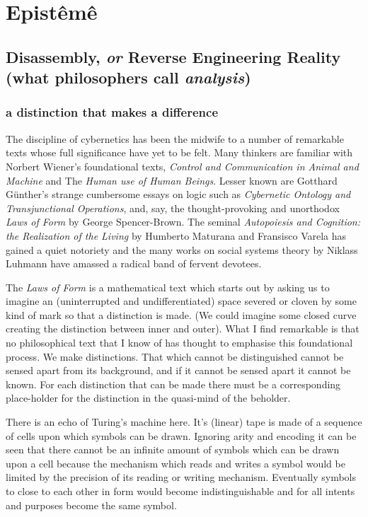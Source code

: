 \documentclass[dah,phd,a4paper]{xe_uccthesis}
\newcommand{\work}[1] {\textit{#1}}
\begin{document}
\renewcommand\thepart{\Alph{part}}
\part{Epistêmê}

\newpage{}


\chapter{Disassembly, \emph{or} Reverse Engineering Reality (what philosophers call \emph{analysis})}

\section{a distinction that makes a difference}

	The discipline of cybernetics has been the midwife to a number of remarkable texts whose full significance have yet to be felt. Many thinkers are familiar with Norbert Wiener's foundational texts, \work{Control and Communication in Animal and Machine} and The \work{Human use of Human Beings}. Lesser known are Gotthard Günther's strange cumbersome essays on logic such as \work{Cybernetic Ontology and Transjunctional Operations}, and, say, the thought-provoking and unorthodox \work{Laws of Form} by George Spencer-Brown. The seminal \work{Autopoiesis and Cognition: the Realization of the Living} by Humberto Maturana and Fransisco Varela has gained a quiet notoriety and the many works on social systems theory by Niklass Luhmann have amassed a radical band of fervent devotees.
	
	The \work{Laws of Form} is a mathematical text which starts out by asking us to imagine an (uninterrupted and undifferentiated) space severed or cloven by some kind of mark so that a distinction is made. (We could imagine some closed curve creating the distinction between inner and outer). What I find remarkable is that no philosophical text that I know of has thought to emphasise this foundational process. We make distinctions. That which cannot be distinguished cannot be sensed apart from its background, and if it cannot be sensed apart it cannot be known. For each distinction that can be made there must be a corresponding place-holder for the distinction in the quasi-mind of the beholder.
	
	There is an echo of Turing's machine here. It's (linear) tape is made of a sequence of cells upon which symbols can be drawn. Ignoring arity and encoding it can be seen that there cannot be an infinite amount of symbols which can be drawn upon a cell because the mechanism which reads and writes a symbol would be limited by the precision of its reading or writing mechanism. Eventually symbols to close to each other in form would become indistinguishable and for all intents and purposes become the same symbol.
	
\end{document}
